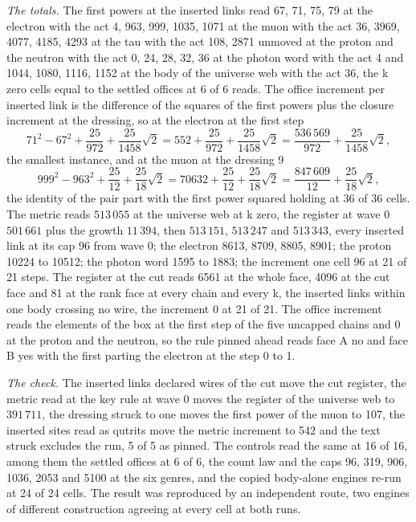 \begin{chproof}
\textit{The totals.} The first powers at the inserted links read 67, 71, 75, 79 at the electron with the act 4, 963, 999, 1035, 1071 at the muon with the act 36, 3969, 4077, 4185, 4293 at the tau with the act 108, 2871 unmoved at the proton and the neutron with the act 0, 24, 28, 32, 36 at the photon word with the act 4 and 1044, 1080, 1116, 1152 at the body of the universe web with the act 36, the k zero cells equal to the settled offices at 6 of 6 reads. The office increment per inserted link is the difference of the squares of the first powers plus the closure increment at the dressing, so at the electron at the first step
\begin{equation}
71^2 - 67^2 + \frac{25}{972} + \frac{25}{1458}\sqrt{2} = 552 + \frac{25}{972} + \frac{25}{1458}\sqrt{2} = \frac{536\,569}{972} + \frac{25}{1458}\sqrt{2},
\end{equation}
the smallest instance, and at the muon at the dressing 9
\begin{equation}
999^2 - 963^2 + \frac{25}{12} + \frac{25}{18}\sqrt{2} = 70632 + \frac{25}{12} + \frac{25}{18}\sqrt{2} = \frac{847\,609}{12} + \frac{25}{18}\sqrt{2},
\end{equation}
the identity of the pair part with the first power squared holding at 36 of 36 cells. The metric reads $513\,055$ at the universe web at k zero, the register at wave 0 $501\,661$ plus the growth $11\,394$, then $513\,151$, $513\,247$ and $513\,343$, every inserted link at its cap 96 from wave 0; the electron 8613, 8709, 8805, 8901; the proton 10224 to 10512; the photon word 1595 to 1883; the increment one cell 96 at 21 of 21 steps. The register at the cut reads 6561 at the whole face, 4096 at the cut face and 81 at the rank face at every chain and every k, the inserted links within one body crossing no wire, the increment 0 at 21 of 21. The office increment reads the elements of the box at the first step of the five uncapped chains and 0 at the proton and the neutron, so the rule pinned ahead reads face A no and face B yes with the first parting the electron at the step 0 to 1.

\textit{The check.} The inserted links declared wires of the cut move the cut register, the metric read at the key rule at wave 0 moves the register of the universe web to $391\,711$, the dressing struck to one moves the first power of the muon to 107, the inserted sites read as qutrits move the metric increment to 542 and the text struck excludes the run, 5 of 5 as pinned. The controls read the same at 16 of 16, among them the settled offices at 6 of 6, the count law and the caps 96, 319, 906, 1036, 2053 and 5100 at the six genres, and the copied body-alone engines re-run at 24 of 24 cells. The result was reproduced by an independent route, two engines of different construction agreeing at every cell at both runs.
\end{chproof}
